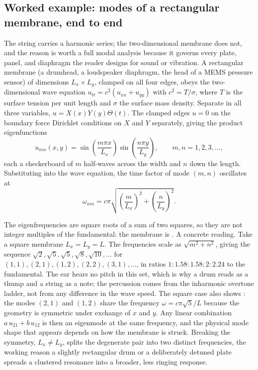 

\subsection{Worked example: modes of a rectangular membrane, end to end}

The string carries a harmonic series; the two-dimensional membrane
does not, and the reason is worth a full modal analysis because it
governs every plate, panel, and diaphragm the reader designs for
sound or vibration. A rectangular membrane (a drumhead, a loudspeaker
diaphragm, the head of a MEMS pressure sensor) of dimensions $L_{x}
\times L_{y}$, clamped on all four edges, obeys the two-dimensional
wave equation $u_{tt} = c^{2}(u_{xx} + u_{yy})$ with $c^{2} =
T/\sigma$, where $T$ is the surface tension per unit length and
$\sigma$ the surface mass density. Separate in all three variables,
$u = X(x)Y(y)\Theta(t)$. The clamped edges $u = 0$ on the boundary
force Dirichlet conditions on $X$ and $Y$ separately, giving the
product eigenfunctions
\[
u_{mn}(x, y) = \sin\!\left(\frac{m\pi x}{L_{x}}\right)
              \sin\!\left(\frac{n\pi y}{L_{y}}\right),
\qquad m, n = 1, 2, 3, \ldots,
\]
each a checkerboard of $m$ half-waves across the width and $n$ down
the length. Substituting into the wave equation, the time factor of
mode $(m, n)$ oscillates at
\[
\omega_{mn} = c\pi\sqrt{\left(\frac{m}{L_{x}}\right)^{2}
                       + \left(\frac{n}{L_{y}}\right)^{2}}.
\]

The eigenfrequencies are square roots of a sum of two squares, so
they are not integer multiples of the fundamental: the membrane is
. A concrete reading. Take a square membrane
$L_{x} = L_{y} = L$. The frequencies scale as $\sqrt{m^{2} + n^{2}}$,
giving the sequence $\sqrt{2}, \sqrt{5}, \sqrt{5}, \sqrt{8},
\sqrt{10}, \ldots$ for $(1,1), (2,1), (1,2), (2,2), (3,1), \ldots$,
in ratios $1 : 1.58 : 1.58 : 2 : 2.24$ to the fundamental. The ear
hears no pitch in this set, which is why a drum reads as a thump and
a string as a note; the percussion comes from the inharmonic overtone
ladder, not from any difference in the wave speed. The square case
also shows : the modes $(2,1)$ and $(1,2)$ share
the frequency $\omega = c\pi\sqrt{5}/L$ because the geometry is
symmetric under exchange of $x$ and $y$. Any linear combination
$a\,u_{21} + b\,u_{12}$ is then an eigenmode at the same frequency,
and the physical mode shape that appears depends on how the membrane
is struck. Breaking the symmetry, $L_{x} \neq L_{y}$, splits the
degenerate pair into two distinct frequencies, the working reason a
slightly rectangular drum or a deliberately detuned plate spreads a
clustered resonance into a broader, less ringing response.

